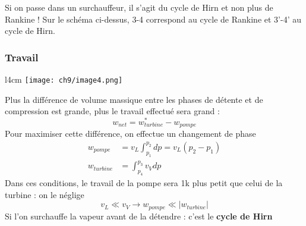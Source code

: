 	\danger Si on passe dans un surchauffeur, il s'agit du cycle de  Hirn et non 
	plus de Rankine ! Sur le schéma ci-dessus, 3-4 correspond au cycle de Rankine 
	et 3'-4' au cycle de Hirn.
	
		\subsubsection{Travail}
		\begin{wrapfigure}[8]{l}{4cm}
		\vspace{-7mm}
		\texttt{[image: ch9/image4.png]}
		\end{wrapfigure}
		Plus la différence de volume massique entre les phases de détente et de 
		compression est grande, plus le travail effectué sera grand :
		\begin{equation}
		w_{net} = w_{turbine}^* - w_{pompe}
		\end{equation}
		Pour maximiser cette différence, on effectue un changement de phase 
		\begin{equation}
		\begin{array}{ll}
		w_{pompe} &= v_L \int_{p_1}^{p_2} dp = v_L(p_2-p_1)\\
		w_{turbine} &= \int_{p_4}^{p_3} v_Vdp
		\end{array}
		\end{equation}
		Dans ces conditions, le travail de la pompe sera 1k plus petit que celui 
		de la turbine : on le néglige
		\begin{equation}
		v_L \ll v_V \rightarrow w_{pompe} \ll |w_{turbine}|
		\end{equation}
		Si l'on surchauffe la vapeur avant de 
		la détendre : c'est le \textbf{cycle de Hirn}
		
